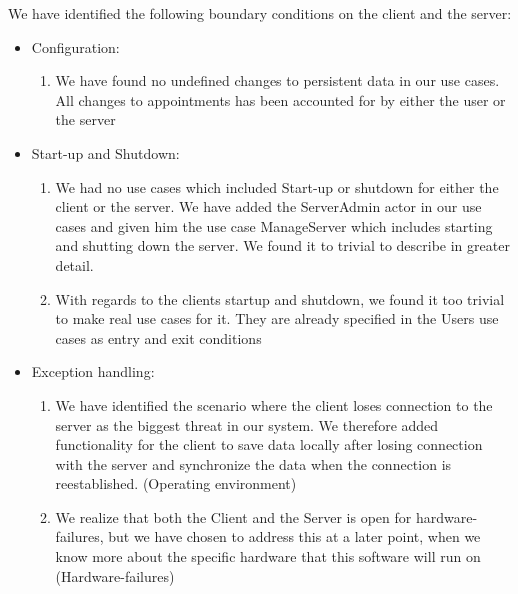 We have identified the following boundary conditions on the client and the server:


\begin{itemize}
	\item Configuration:
	\begin{enumerate}
		\item We have found no undefined changes to persistent data in our use cases. All changes to appointments has been accounted for by either the user or the server
	\end{enumerate}
	\item Start-up and Shutdown:
	\begin{enumerate}
		\item We had no use cases which included Start-up or shutdown for either the client or the server. We have added the ServerAdmin actor in our use cases and given him the use case ManageServer which includes starting and shutting down the server. We found it to trivial to describe in greater detail.
		\item With regards to the clients startup and shutdown, we found it too trivial to make real use cases for it. They are already specified in the Users use cases as entry and exit conditions
	\end{enumerate}
	\item Exception handling:
	\begin{enumerate}
		\item We have identified the scenario where the client loses connection to the server as the biggest threat in our system. We therefore added functionality for the client to save data locally after losing connection with the server and synchronize the data when the connection is reestablished. (Operating environment)
		\item We realize that both the Client and the Server is open for hardware-failures, but we have chosen to address this at a later point, when we know more about the specific hardware that this software will run on (Hardware-failures)
	\end{enumerate}
\end{itemize}